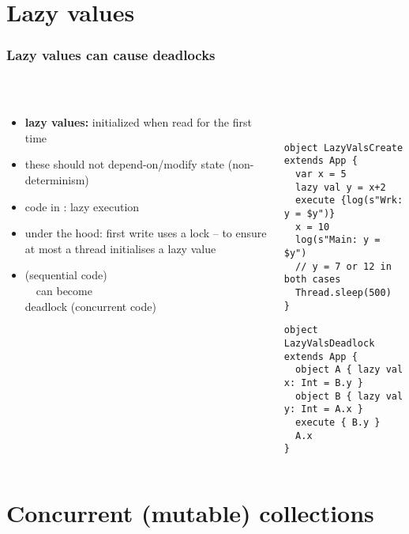 \documentclass[aspectratio=169]{beamer}
\begin{document}
\section{Lazy values}

\begin{frame}[fragile]\frametitle{Lazy values can cause deadlocks}
~\\[-8mm]
\begin{columns}
\begin{column}{0.48\textwidth}
\begin{itemize}
  \item \alert{\textbf{lazy values:}} initialized when read for the first time
  \item these should not depend-on/modify state (non-determinism)
  \item code in : lazy execution
  \item under the hood: first write uses a lock -- to ensure at most a thread initialises a lazy value
  \item {} (sequential code)\\~~can become\\
        \alert{deadlock} (concurrent code)

\end{itemize}
\end{column}
\begin{column}{0.54\textwidth}
~\\
\begin{lstlisting}[emph={execute,sleep,log,compareAndSet,mySynchronized,AtomicBoolean}]
object LazyValsCreate extends App {
  var x = 5
  lazy val y = x+2
  execute {log(s"Wrk: y = $y")}
  x = 10
  log(s"Main: y = $y")
  // y = 7 or 12 in both cases
  Thread.sleep(500)
}
\end{lstlisting}
\begin{lstlisting}[emph={execute,sleep,log,compareAndSet,mySynchronized,AtomicBoolean}]
object LazyValsDeadlock extends App {
  object A { lazy val x: Int = B.y }
  object B { lazy val y: Int = A.x }
  execute { B.y }
  A.x
}
\end{lstlisting}
\end{column}
\end{columns}
\end{frame}

\section{Concurrent (mutable) collections}
\end{document}
